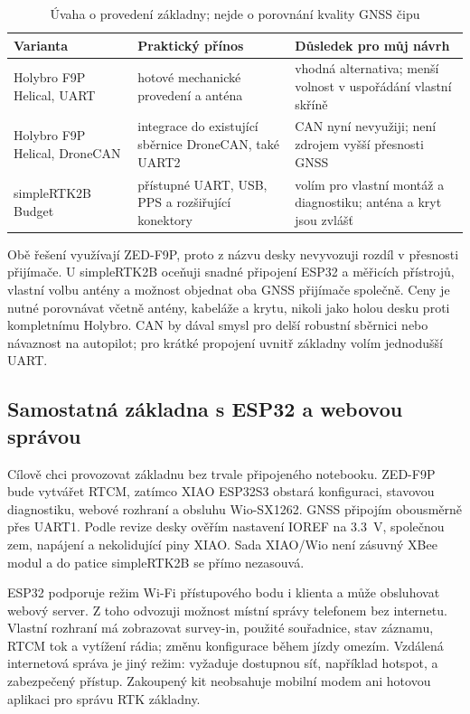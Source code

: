 \begin{table}[htbp]
  \centering
  \small
  \caption{Úvaha o provedení základny; nejde o porovnání kvality GNSS čipu}
  \label{tab:base-board}
  \begin{tabularx}{\textwidth}{@{}L{0.25\textwidth}YY@{}}
    \toprule
    Varianta & Praktický přínos & Důsledek pro můj návrh \\
    \midrule
    Holybro F9P Helical, UART
      & hotové mechanické provedení a anténa
      & vhodná alternativa; menší volnost v uspořádání vlastní skříně \\
    Holybro F9P Helical, DroneCAN
      & integrace do existující sběrnice DroneCAN, také UART2
      & CAN nyní nevyužiji; není zdrojem vyšší přesnosti GNSS \\
    simpleRTK2B Budget
      & přístupné UART, USB, PPS a rozšiřující konektory
      & volím pro vlastní montáž a diagnostiku; anténa a kryt jsou zvlášť \\
    \bottomrule
  \end{tabularx}
\end{table}

Obě řešení využívají ZED-F9P, proto z názvu desky nevyvozuji rozdíl
v přesnosti přijímače. U simpleRTK2B oceňuji snadné připojení ESP32
a měřicích přístrojů, vlastní volbu antény a možnost objednat oba GNSS
přijímače společně.\cite{ardusimple-f9p-guide}
Ceny je nutné porovnávat včetně antény, kabeláže a krytu, nikoli jako
holou desku proti kompletnímu Holybro. CAN by dával smysl pro delší
robustní sběrnici nebo návaznost na autopilot; pro krátké propojení uvnitř
základny volím jednodušší UART.

\subsection{Samostatná základna s ESP32 a webovou správou}

Cílově chci provozovat základnu bez trvale připojeného notebooku.
ZED-F9P bude vytvářet RTCM, zatímco XIAO ESP32S3 obstará konfiguraci,
stavovou diagnostiku, webové rozhraní a obsluhu Wio-SX1262. GNSS připojím
obousměrně přes UART1. Podle revize desky ověřím nastavení IOREF na
\SI{3.3}{V}, společnou zem, napájení a nekolidující piny XIAO.
Sada XIAO/Wio není zásuvný XBee modul a do patice simpleRTK2B se přímo
nezasouvá.\cite{ardusimple-f9p-guide,seeed-xiao-wio}

ESP32 podporuje režim Wi-Fi přístupového bodu i klienta a může obsluhovat
webový server.\cite{esp32-wifi}
Z toho odvozuji možnost místní správy telefonem bez internetu. Vlastní
rozhraní má zobrazovat survey-in, použité souřadnice, stav záznamu,
RTCM tok a vytížení rádia; změnu konfigurace během jízdy omezím.
Vzdálená internetová správa je jiný režim: vyžaduje dostupnou síť,
například hotspot, a zabezpečený přístup. Zakoupený kit neobsahuje
mobilní modem ani hotovou aplikaci pro správu RTK základny.

